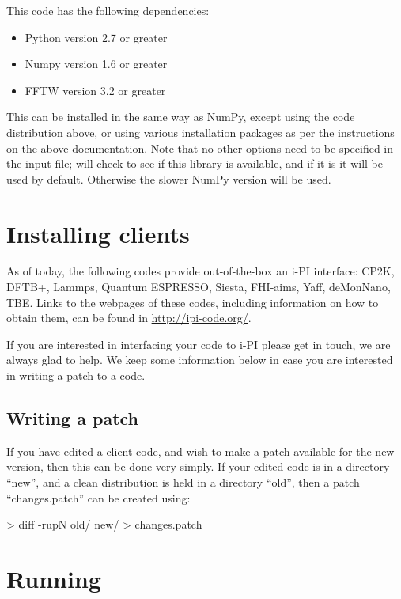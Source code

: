 \documentclass[11pt,english,fleqn]{report}
\newenvironment{code}{%
\footnotesize 
\verbatim
}{
\endverbatim
\normalsize
}
\begin{document}
This code has the following dependencies:
\begin{itemize}
\item Python version 2.7 or greater
\item Numpy version 1.6 or greater
\item FFTW version 3.2 or greater
\end{itemize}
This can be installed in the same way as NumPy, except using the code
distribution above, or using various installation packages as per
the instructions on the above documentation. Note that no other options
need to be specified in the input file; \ipi will check to
see if this library is available, and if it is it will be used by
default. Otherwise the slower NumPy version will be used.


\section{Installing clients}

\label{clientinstall}

As of today, the following codes provide out-of-the-box an i-PI interface: CP2K, DFTB+, Lammps, Quantum ESPRESSO, Siesta, FHI-aims, Yaff, deMonNano, TBE. 
Links to the webpages of these codes, including information on how to obtain them, can be found in \url{http://ipi-code.org/}.

If you are interested in interfacing your code to i-PI please get in touch, we are always glad to help.
We keep some information below in case you are interested in writing a patch to a code.

\subsection{Writing a patch}

If you have edited a client code, and wish to make a patch available
for the new version, then this can be done very simply.
If your edited code is in a directory {}``new'', and a clean
distribution is held in a directory {}``old'', then a patch
{}``changes.patch'' can be created using:

\begin{code}
> diff -rupN old/ new/ > changes.patch
\end{code}

\section{Running \ipi}
\end{document}
